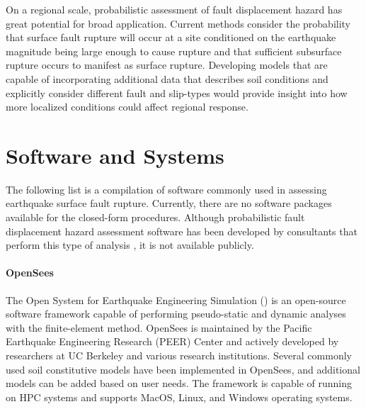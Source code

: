 On a regional scale, probabilistic assessment of fault displacement hazard has great potential for broad application. Current methods consider the probability that surface fault rupture will occur at a site conditioned on the earthquake magnitude being large enough to cause rupture and that sufficient subsurface rupture occurs to manifest as surface rupture. Developing models that are capable of incorporating additional data that describes soil conditions and explicitly consider different fault and slip-types would provide insight into how more localized conditions could affect regional response.


\section{Software and Systems}
\label{sec:eq_surface_rup_tools}

The following list is a compilation of software commonly used in assessing earthquake surface fault rupture. Currently, there are no software packages available for the closed-form procedures. Although probabilistic fault displacement hazard assessment software has been developed by consultants that perform this type of analysis \citep{wells2014probabilistic}, it is not available publicly.

\paragraph{OpenSees}
The Open System for Earthquake Engineering Simulation () is an open-source software framework capable of performing pseudo-static and dynamic analyses with the finite-element method. OpenSees is maintained by the Pacific Earthquake Engineering Research (PEER) Center and actively developed by researchers at UC Berkeley and various research institutions. Several commonly used soil constitutive models have been implemented in OpenSees, and additional models can be added based on user needs. The framework is capable of running on HPC systems and supports MacOS, Linux, and Windows operating systems.

